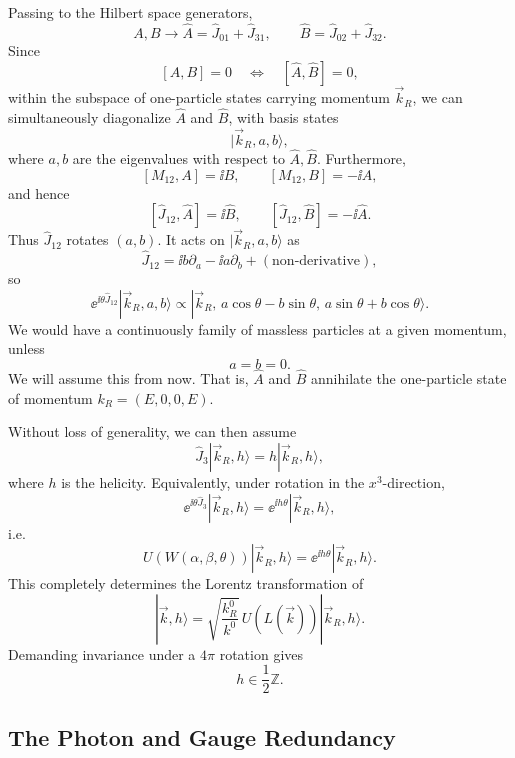 Passing to the Hilbert space generators,
\[
  A,B\longrightarrow
  \widehat A=\widehat J_{01}+\widehat J_{31},
  \qquad
  \widehat B=\widehat J_{02}+\widehat J_{32}.
\]
Since
\[
  [A,B]=0
  \quad\Longleftrightarrow\quad
  [\widehat A,\widehat B]=0,
\]
within the subspace of one-particle states carrying momentum
\(\vec k_R\), we can simultaneously diagonalize \(\widehat A\) and
\(\widehat B\), with basis states
\[
  |\vec k_R,a,b\rangle,
\]
where \(a,b\) are the eigenvalues with respect to
\(\widehat A,\widehat B\).  Furthermore,
\[
  [M_{12},A]=\ii B,\qquad
  [M_{12},B]=-\ii A,
\]
and hence
\[
  [\widehat J_{12},\widehat A]=\ii\widehat B,
  \qquad
  [\widehat J_{12},\widehat B]=-\ii\widehat A.
\]
Thus \(\widehat J_{12}\) rotates \((a,b)\).  It acts on
\(|\vec k_R,a,b\rangle\) as
\[
  \widehat J_{12}
  =
  \ii b\partial_a-\ii a\partial_b
  +(\text{non-derivative}),
\]
so
\[
  \ee^{\ii\theta\widehat J_{12}}|\vec k_R,a,b\rangle
  \propto
  |\vec k_R,\,
    a\cos\theta-b\sin\theta,\,
    a\sin\theta+b\cos\theta\rangle .
\]
We would have a continuously family of massless particles at a given
momentum, unless
\[
  a=b=0.
\]
We will assume this from now.  That is, \(\widehat A\) and \(\widehat B\)
annihilate the one-particle state of momentum \(k_R=(E,0,0,E)\).

Without loss of generality, we can then assume
\[
  \widehat J_3|\vec k_R,h\rangle
  =
  h|\vec k_R,h\rangle,
\]
where \(h\) is the helicity.  Equivalently, under rotation in the
\(x^3\)-direction,
\[
  \ee^{\ii\theta\widehat J_3}|\vec k_R,h\rangle
  =
  \ee^{\ii h\theta}|\vec k_R,h\rangle,
\]
i.e.
\[
  U(W(\alpha,\beta,\theta))|\vec k_R,h\rangle
  =
  \ee^{\ii h\theta}|\vec k_R,h\rangle.
\]
This completely determines the Lorentz transformation of
\[
  |\vec k,h\rangle
  =
  \sqrt{\frac{k_R^0}{k^0}}\,
  U(L(\vec k))|\vec k_R,h\rangle.
\]
Demanding invariance under a \(4\pi\) rotation gives
\[
  h\in\frac12\mathbb Z.
\]

\subsection{The Photon and Gauge Redundancy}

